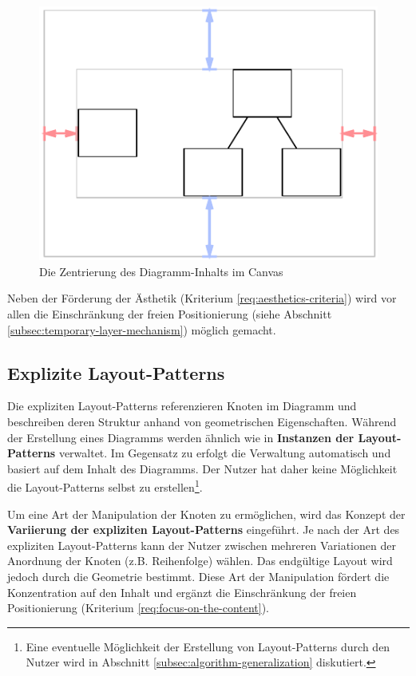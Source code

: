 \begin{figure}[hbt]
    \centering
    \includegraphics{resources/layout-pattern-centered-content}
    \caption{Die Zentrierung des Diagramm-Inhalts im Canvas}
    \label{fig:layout-pattern-centered-content}
\end{figure}

Neben der Förderung der Ästhetik (Kriterium \ref{req:aesthetics-criteria}) wird vor allen die Einschränkung der freien Positionierung (siehe Abschnitt \ref{subsec:temporary-layer-mechanism}) möglich gemacht.

\subsection{Explizite Layout-Patterns}
\label{subsec:explicit-layout-patterns}

Die expliziten Layout-Patterns referenzieren Knoten im Diagramm und beschreiben deren Struktur anhand von geometrischen Eigenschaften. Während der Erstellung eines Diagramms werden ähnlich wie in \cite{Maier12A-Pattern-based} \textbf{Instanzen der Layout-Patterns} verwaltet. Im Gegensatz zu \cite{Maier12A-Pattern-based} erfolgt die Verwaltung automatisch und basiert auf dem Inhalt des Diagramms. Der Nutzer hat daher keine Möglichkeit die Layout-Patterns selbst zu erstellen\footnote{Eine eventuelle Möglichkeit der Erstellung von Layout-Patterns durch den Nutzer wird in Abschnitt \ref{subsec:algorithm-generalization} diskutiert.}.

Um eine Art der Manipulation der Knoten zu ermöglichen, wird das Konzept der \textbf{Variierung der expliziten Layout-Patterns} eingeführt. Je nach der Art des expliziten Layout-Patterns kann der Nutzer zwischen mehreren Variationen der Anordnung der Knoten (z.B. Reihenfolge) wählen. Das endgültige Layout wird jedoch durch die Geometrie bestimmt. Diese Art der Manipulation fördert die Konzentration auf den Inhalt und ergänzt die Einschränkung der freien Positionierung (Kriterium \ref{req:focus-on-the-content}).

